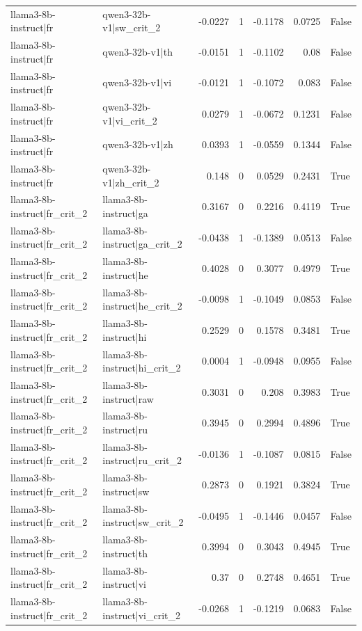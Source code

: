 \begin{table}
\begin{tabular}{l l r r r r l}
llama3-8b-instruct|fr & qwen3-32b-v1|sw_crit_2 & -0.0227 & 1 & -0.1178 & 0.0725 & False \\
llama3-8b-instruct|fr & qwen3-32b-v1|th & -0.0151 & 1 & -0.1102 & 0.08 & False \\
llama3-8b-instruct|fr & qwen3-32b-v1|vi & -0.0121 & 1 & -0.1072 & 0.083 & False \\
llama3-8b-instruct|fr & qwen3-32b-v1|vi_crit_2 & 0.0279 & 1 & -0.0672 & 0.1231 & False \\
llama3-8b-instruct|fr & qwen3-32b-v1|zh & 0.0393 & 1 & -0.0559 & 0.1344 & False \\
llama3-8b-instruct|fr & qwen3-32b-v1|zh_crit_2 & 0.148 & 0 & 0.0529 & 0.2431 & True \\
llama3-8b-instruct|fr_crit_2 & llama3-8b-instruct|ga & 0.3167 & 0 & 0.2216 & 0.4119 & True \\
llama3-8b-instruct|fr_crit_2 & llama3-8b-instruct|ga_crit_2 & -0.0438 & 1 & -0.1389 & 0.0513 & False \\
llama3-8b-instruct|fr_crit_2 & llama3-8b-instruct|he & 0.4028 & 0 & 0.3077 & 0.4979 & True \\
llama3-8b-instruct|fr_crit_2 & llama3-8b-instruct|he_crit_2 & -0.0098 & 1 & -0.1049 & 0.0853 & False \\
llama3-8b-instruct|fr_crit_2 & llama3-8b-instruct|hi & 0.2529 & 0 & 0.1578 & 0.3481 & True \\
llama3-8b-instruct|fr_crit_2 & llama3-8b-instruct|hi_crit_2 & 0.0004 & 1 & -0.0948 & 0.0955 & False \\
llama3-8b-instruct|fr_crit_2 & llama3-8b-instruct|raw & 0.3031 & 0 & 0.208 & 0.3983 & True \\
llama3-8b-instruct|fr_crit_2 & llama3-8b-instruct|ru & 0.3945 & 0 & 0.2994 & 0.4896 & True \\
llama3-8b-instruct|fr_crit_2 & llama3-8b-instruct|ru_crit_2 & -0.0136 & 1 & -0.1087 & 0.0815 & False \\
llama3-8b-instruct|fr_crit_2 & llama3-8b-instruct|sw & 0.2873 & 0 & 0.1921 & 0.3824 & True \\
llama3-8b-instruct|fr_crit_2 & llama3-8b-instruct|sw_crit_2 & -0.0495 & 1 & -0.1446 & 0.0457 & False \\
llama3-8b-instruct|fr_crit_2 & llama3-8b-instruct|th & 0.3994 & 0 & 0.3043 & 0.4945 & True \\
llama3-8b-instruct|fr_crit_2 & llama3-8b-instruct|vi & 0.37 & 0 & 0.2748 & 0.4651 & True \\
llama3-8b-instruct|fr_crit_2 & llama3-8b-instruct|vi_crit_2 & -0.0268 & 1 & -0.1219 & 0.0683 & False \\

\end{tabular}
\end{table}
